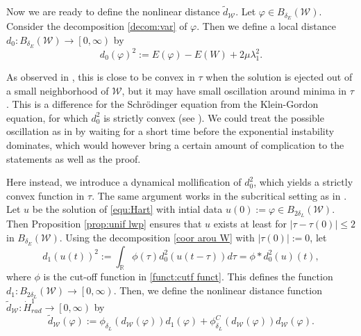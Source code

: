\documentclass[reqno, 11pt]{amsart}
\numberwithin{equation}{section}
\newcommand{\R}{\mathbb{R}}
\theoremstyle{plain}
\theoremstyle{definition}
\numberwithin{equation}{section}
\numberwithin{theorem}{section}
\numberwithin{equation}{section}
\numberwithin{equation}{section}
\numberwithin{theorem}{section}
\begin{document}
	Now we are ready to define the nonlinear distance $\widetilde{d}_{\mathcal{W}}$. Let $\varphi\in B_{\delta_E}(\mathcal{W})$. Consider the decomposition \eqref{decom:var} of $\varphi$. Then we define a local distance $d_0:B_{\delta_E}(\mathcal{W}) \rightarrow \left[0,\infty \right)$ by 
	\begin{equation}\label{quan:d_0}
	d_0(\varphi)^2:=E(\varphi)-E(W)+2\mu\lambda_{1}^2.
	\end{equation}
	
	As observed in \cite{NakS:NLS}, this is close to be convex in $\tau$ when the solution is ejected out of a small neighborhood of $\mathcal{W}$, but it may have small oscillation around minima in $\tau$. This is a difference for the Schrödinger equation from the Klein-Gordon equation, for which $d_{0}^{2}$ is strictly convex (see \cite{NakS:NLKG}). We could treat the possible oscillation as in \cite{NakS:NLS} by waiting for a short time before the exponential instability dominates, which would however bring a certain amount of complication to the statements as well as the proof.
	
	Here instead, we introduce a dynamical mollification of $d_{0}^2$, which yields a strictly convex function in $\tau$. The same argument works in the subcritical setting as in \cite{NakS:NLS}. Let $u$ be the solution of \eqref{equ:Hart} with intial data $u(0):=\varphi\in B_{2\delta_L}(\mathcal{W})$. Then Proposition \ref{prop:unif lwp} ensures that $u$ exists at least for $|\tau-\tau(0)|\leq 2$ in $B_{\delta_E}(\mathcal{W})$. Using the decomposition \eqref{coor arou W} with $|\tau(0)|:=0$, let 
	\begin{equation}\label{quan:d_1}
	d_1(u(t))^2:=\int_{\R}\phi(\tau)d_{0}^{2}(u(t-\tau))d\tau=\phi*d_{0}^{2}(u)(t),
	\end{equation}
	where $\phi$ is the cut-off function in \eqref{funct:cutf funct}. This defines the function $d_1:B_{2\delta_L}(\mathcal{W}) \rightarrow \left[0,\infty \right)$. Then, we define the nonlinear distance function $\widetilde{d}_{\mathcal{W}}:\dot H^1_{rad} \rightarrow \left[0,\infty \right)$ by 
	\begin{equation}\label{quan:d equi}
	\widetilde{d}_{\mathcal{W}}(\varphi):=\phi_{\delta_L}\left( {d}_{\mathcal{W}}(\varphi) \right)d_1(\varphi)+\phi_{\delta_L}^{C}\left( {d}_{\mathcal{W}}(\varphi) \right)d_{\mathcal{W}}(\varphi).
	\end{equation}
	
	
	
\end{document}
